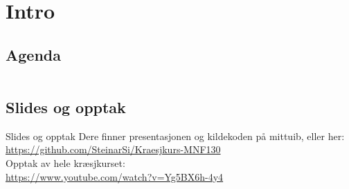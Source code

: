 \begin{frame}[t,plain]
    \titlepage
\end{frame}

\section*{Intro}
\subsection*{Agenda}
\begin{frame}
    \begin{columns}[t]
        \begin{column}{.5\textwidth}
            \tableofcontents[sections={1-5}]
        \end{column}
        \begin{column}{.5\textwidth}
            \tableofcontents[sections={6-}]
        \end{column}
    \end{columns}
\end{frame}

\subsection*{Slides og opptak}
\begin{frame}{Slides og opptak}
    Dere finner presentasjonen og kildekoden på mittuib, eller her:\\
    \url{https://github.com/SteinarSi/Kraesjkurs-MNF130}\\

    Opptak av hele kræsjkurset:\\
    \url{https://www.youtube.com/watch?v=Yg5BX6h-4y4}
\end{frame}